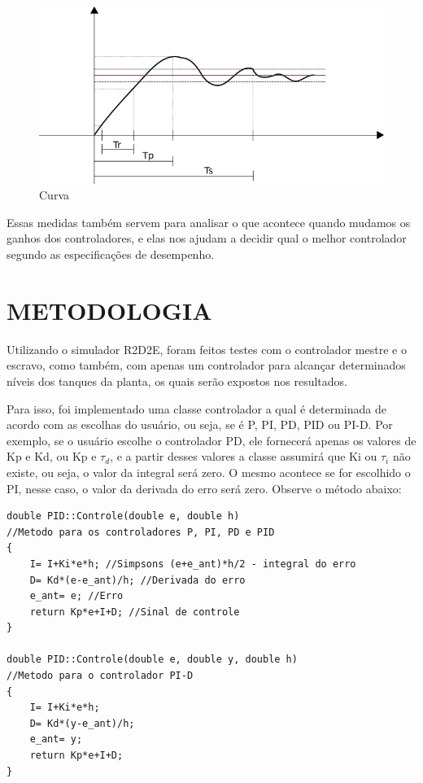 \documentclass[a4paper,12pt]{article}
\begin{document}
\begin{figure}[H]
\centering
\includegraphics[width=15cm]{fotosLab3/ref.png}
\caption{Curva}
\label{curva}
\end{figure}


\hspace{4ex}Essas medidas também servem para analisar o que acontece quando mudamos os ganhos dos controladores, e elas nos ajudam a decidir qual o melhor controlador segundo as especificações de desempenho.


\newpage


\thispagestyle{main}

\section{METODOLOGIA}

\hspace{4ex}Utilizando o simulador R2D2E, foram feitos testes com o controlador mestre e o escravo, como também, com apenas um controlador para alcançar determinados níveis dos tanques da planta, os quais serão expostos nos resultados.

\hspace{4ex}Para isso, foi implementado uma classe controlador a qual é determinada de acordo com as escolhas do usuário, ou seja, se é P, PI, PD, PID ou PI-D. Por exemplo, se o usuário escolhe o controlador PD, ele fornecerá apenas os valores de Kp e Kd, ou Kp e $\tau_d$, e a partir desses valores a classe assumirá que Ki ou $\tau_i$ não existe, ou seja, o valor da integral será zero. O mesmo acontece se for escolhido o PI, nesse caso, o valor da derivada do erro será zero. Observe o método abaixo:
\\
\begin{lstlisting}
double PID::Controle(double e, double h)
//Metodo para os controladores P, PI, PD e PID
{
    I= I+Ki*e*h; //Simpsons (e+e_ant)*h/2 - integral do erro
    D= Kd*(e-e_ant)/h; //Derivada do erro
    e_ant= e; //Erro
    return Kp*e+I+D; //Sinal de controle
}

double PID::Controle(double e, double y, double h)
//Metodo para o controlador PI-D
{
    I= I+Ki*e*h;
    D= Kd*(y-e_ant)/h;
    e_ant= y;
    return Kp*e+I+D;
}
\end{lstlisting}
\end{document}
